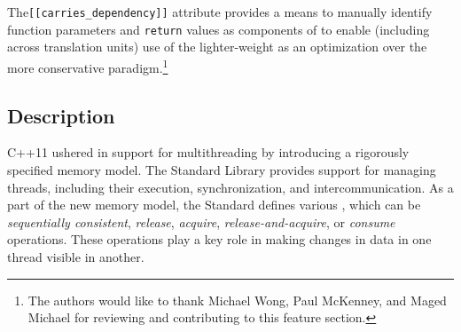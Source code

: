 

\label{the-carries_dependency-attribute}
\setcounter{table}{0}
\setcounter{footnote}{0}
\setcounter{lstlisting}{0}

The\lstinline![[carries_dependency]]! attribute provides a means to
manually identify function parameters and \lstinline!return! values as
components of  to enable (including
across translation units) use of the lighter-weight
  as an
optimization over the more conservative 
paradigm.{\cprotect\footnote{The authors would like to thank Michael
Wong, Paul McKenney, and Maged Michael for reviewing and contributing to this feature section.}}

\subsection[Description]{Description}\label{description}

C++11 ushered in support for multithreading by introducing a rigorously
specified memory model. The Standard Library provides support for
managing threads, including their execution, synchronization, and
intercommunication. As a part of the new memory model, the Standard
defines various , which can be \emph{sequentially
consistent}, \emph{release}, \emph{acquire}, 
\emph{release-and-acquire}, or \emph{consume} operations. These
operations play a key role in making changes in data in one thread
visible in another.

